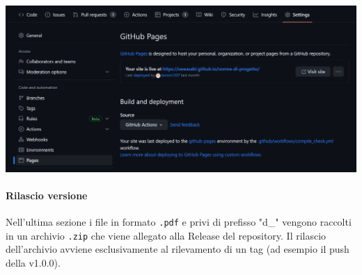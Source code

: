 \includegraphics[width=\linewidth]{img/pages_actions.png}

\paragraph{Rilascio versione} Nell'ultima sezione i file in formato \texttt{.pdf} e privi di prefisso "d\_" vengono raccolti in un archivio \texttt{.zip} che viene allegato alla Release del repository. Il rilascio dell'archivio avviene esclusivamente al rilevamento di un tag (ad esempio il push della v1.0.0).

